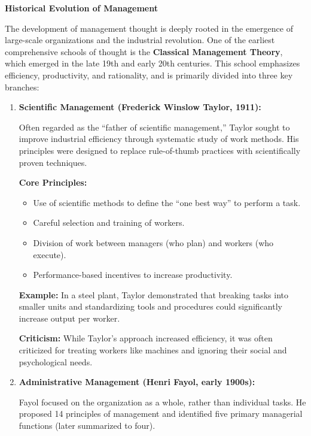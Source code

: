 \documentclass[10pt,a4paper]{book}
\begin{document}
\begin{multicols}{2}
    


\textbf{Historical Evolution of Management}

The development of management thought is deeply rooted in the emergence of large-scale organizations and the industrial revolution. One of the earliest comprehensive schools of thought is the \textbf{Classical Management Theory}, which emerged in the late 19th and early 20th centuries. This school emphasizes efficiency, productivity, and rationality, and is primarily divided into three key branches:

\begin{enumerate}
    \item \textbf{Scientific Management (Frederick Winslow Taylor, 1911):}

    Often regarded as the “father of scientific management,” Taylor sought to improve industrial efficiency through systematic study of work methods. His principles were designed to replace rule-of-thumb practices with scientifically proven techniques.

    \textbf{Core Principles:}
    \begin{itemize}
        \item Use of scientific methods to define the “one best way” to perform a task.
        \item Careful selection and training of workers.
        \item Division of work between managers (who plan) and workers (who execute).
        \item Performance-based incentives to increase productivity.
    \end{itemize}

    \textbf{Example:} In a steel plant, Taylor demonstrated that breaking tasks into smaller units and standardizing tools and procedures could significantly increase output per worker.

    \textbf{Criticism:} While Taylor’s approach increased efficiency, it was often criticized for treating workers like machines and ignoring their social and psychological needs.

    \item \textbf{Administrative Management (Henri Fayol, early 1900s):}

    Fayol focused on the organization as a whole, rather than individual tasks. He proposed 14 principles of management and identified five primary managerial functions (later summarized to four).


\end{enumerate}
\end{multicols}
\end{document}
